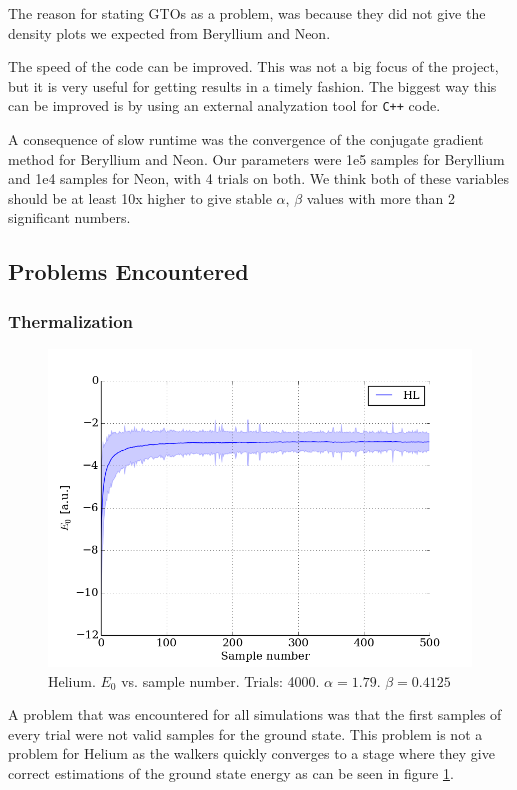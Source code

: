 \documentclass[twocolumns, a4paper,11pt,fleqn]{extarticle}
\begin{document}
The reason for stating GTOs as a problem, was because they did not give the
density plots we expected from Beryllium and Neon.\\


\noindent The speed of the code can be improved. 
This was not a big focus of the project, but
it is very useful for getting results in a timely fashion. The biggest way this
can be improved is by using an external analyzation tool for \verb!C++! code. 

A consequence of slow runtime was the convergence of 
the conjugate gradient method for Beryllium and Neon. 
Our parameters were 1e5 samples for Beryllium and 1e4 samples for Neon, with 4 trials
on both. We think both of these variables should be at least 10x higher to give
stable $\alpha$, $\beta$ values with more than 2 significant numbers.

\subsection{Problems Encountered}
\subsubsection{Thermalization}
\begin{figure}[H]
	\includegraphics[width=\columnwidth]{../res/plot/helium_04/helium_04_pretty.png}
	\caption[caption]{Helium. $E_0$ vs. sample number. 
	 	Trials: 4000. $\alpha = 1.79$. 
	$\beta = 0.4125$}
	\label{fig:helium_04}
\end{figure}
A problem that was encountered 
for all simulations was that the first samples of every 
trial were not valid samples for the ground state. This problem is not a problem for
Helium as the walkers quickly converges to a stage where they give correct
estimations of the ground state energy
as can be seen in figure \ref{fig:helium_04}. 
\end{document}
